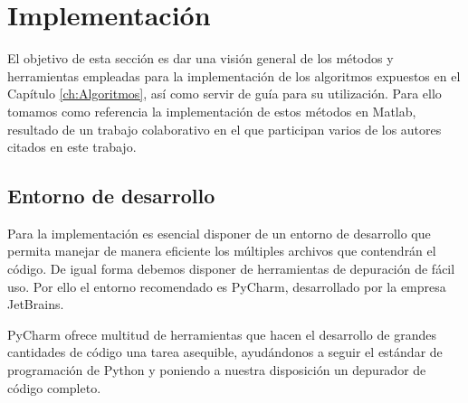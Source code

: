 






\chapter{Implementación}\label{ch:Impl}

El objetivo de esta sección es dar una visión general de los métodos y herramientas empleadas para la implementación de los algoritmos expuestos en el Capítulo \ref{ch:Algoritmos}, así como servir de guía para su utilización. Para ello tomamos como referencia la implementación de estos métodos en Matlab, resultado de un trabajo colaborativo en el que participan varios de los autores citados en este trabajo. \cite{Metodos}

\section{Entorno de desarrollo}

Para la implementación es esencial disponer de un entorno de desarrollo que permita manejar de manera eficiente los múltiples archivos que contendrán el código. De igual forma debemos disponer de herramientas de depuración de fácil uso. Por ello el entorno recomendado es PyCharm, desarrollado por la empresa JetBrains.

PyCharm ofrece multitud de herramientas que hacen el desarrollo de grandes cantidades de código una tarea asequible, ayudándonos a seguir el estándar de programación de Python y poniendo a nuestra disposición un depurador de código completo.

